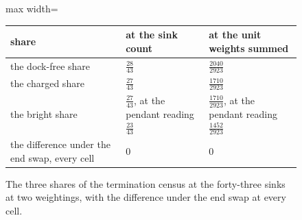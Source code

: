 \begin{figure}[h]\centering
\begin{adjustbox}{max width=\linewidth}\begin{tabular}{lll}\toprule
share & at the sink count & at the unit weights summed \\ \midrule
the dock-free share & $\tfrac{28}{43}$ & $\tfrac{2040}{2923}$ \\
the charged share & $\tfrac{27}{43}$ & $\tfrac{1710}{2923}$ \\
the bright share & $\tfrac{27}{43}$, at the pendant reading $\tfrac{23}{43}$ & $\tfrac{1710}{2923}$, at the pendant reading $\tfrac{1452}{2923}$ \\
the difference under the end swap, every cell & $0$ & $0$ \\ \bottomrule
\end{tabular}\end{adjustbox}
\caption{The three shares of the termination census at the forty-three sinks at two weightings, with the difference under the end swap at every cell.}
\end{figure}

